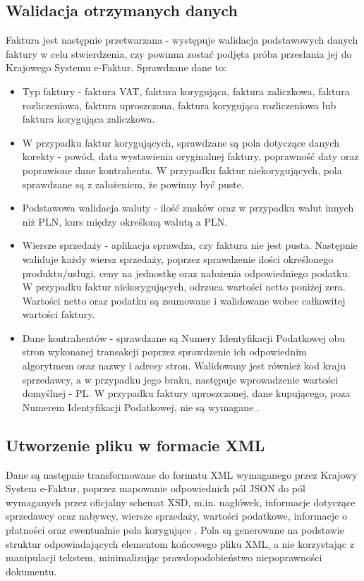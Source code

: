 \subsection{Walidacja otrzymanych danych}
Faktura jest następnie przetwarzana - występuje walidacja podstawowych danych faktury w celu stwierdzenia, czy powinna zostać podjęta próba przesłania jej do Krajowego Systemu e-Faktur. Sprawdzane dane to:
\begin{itemize}
    \item Typ faktury - faktura VAT, faktura korygująca, faktura zaliczkowa, faktura rozliczeniowa, faktura uproszczona, faktura korygująca rozliczeniowa lub faktura korygująca zaliczkowa.
    \item W przypadku faktur korygujących, sprawdzane są pola dotyczące danych korekty - powód, data wystawienia oryginalnej faktury, poprawność daty oraz poprawione dane kontrahenta. W przypadku faktur niekorygujących, pola sprawdzane są z założeniem, że powinny być puste.
    \item Podstawowa walidacja waluty - ilość znaków oraz w przypadku walut innych niż PLN, kurs między określoną walutą a PLN. 
    \item Wiersze sprzedaży - aplikacja sprawdza, czy faktura nie jest pusta. Następnie waliduje każdy wiersz sprzedaży, poprzez sprawdzenie ilości określonego produktu/usługi, ceny na jednostkę oraz nałożenia odpowiedniego podatku. W przypadku faktur niekorygujących, odrzuca wartości netto poniżej zera. Wartości netto oraz podatku są zsumowane i walidowane wobec całkowitej wartości faktury.
    \item Dane kontrahentów - sprawdzane są Numery Identyfikacji Podatkowej obu stron wykonanej transakcji poprzez sprawdzenie ich odpowiednim algorytmem oraz nazwy i adresy stron. Walidowany jest również kod kraju sprzedawcy, a w przypadku jego braku, następuje wprowadzenie wartości domyślnej - PL. W przypadku faktury uproszczonej, dane kupującego, poza Numerem Identyfikacji Podatkowej, nie są wymagane \parencite{ksef_fa3_brochure}.
\end{itemize}

\subsection{Utworzenie pliku w formacie XML}
Dane są następnie transformowane do formatu XML wymaganego przez Krajowy System e-Faktur, poprzez mapowanie odpowiednich pól JSON do pól wymaganych przez oficjalny schemat XSD, m.in. nagłówek, informacje dotyczące sprzedawcy oraz nabywcy, wiersze sprzedaży, wartości podatkowe, informacje o płatności oraz ewentualnie pola korygujące \parencite{structured_invoice_2025}.
Pola są generowane na podstawie struktur odpowiadających elementom końcowego pliku XML, a nie korzystając z manipulacji tekstem, minimalizując prawdopodobieństwo niepoprawności dokumentu. 

